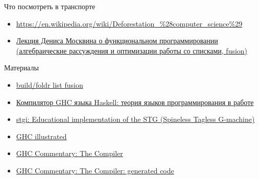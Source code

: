 
    \begin{frame}{Что посмотреть в транспорте}
        \begin{itemize}
            \item {\color{blue}\url{https://en.wikipedia.org/wiki/Deforestation\_\%28computer\_science\%29}}
            \item \href{https://youtu.be/d3lYx13kdWU?si=ctrQy6pm_44aOgmR}{\color{blue} Лекция Дениса Москвина о функциональном программировании (алгебраические рассуждения и оптимизации работы со списками, fusion)}
        \end{itemize}
    \end{frame}

    \begin{frame}{Материалы}
        \begin{itemize}
            \item \href{https://wiki.haskell.org/GHC\_optimisations\#Fusion}{\color{blue} build/foldr list fusion}
            \item \href{https://www.lektorium.tv/node/32421}{\color{blue} Компилятор GHC языка Haskell: теория языков программирования в работе}
            \item \href{https://hackage.haskell.org/package/stgi}{\color{blue} stgi: Educational implementation of the STG (Spineless Tagless G-machine)}
            \item \href{https://takenobu-hs.github.io/downloads/haskell_ghc_illustrated.pdf}{\color{blue} GHC illustrated}
            \item \href{https://gitlab.haskell.org/ghc/ghc/-/wikis/commentary/compiler/}{\color{blue} GHC Commentary: The Compiler}
            \item \href{https://gitlab.haskell.org/ghc/ghc/-/wikis/commentary/compiler/generated-code}{\color{blue} GHC Commentary: The Compiler: generated code}
        \end{itemize}
    \end{frame}


